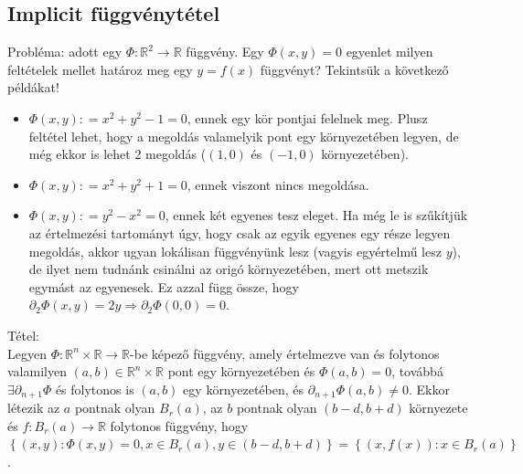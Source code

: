 \documentclass[12pt,a4paper]{scrartcl}
\providecommand{\tightlist}{%
  \setlength{\itemsep}{0pt}\setlength{\parskip}{0pt}}
\newenvironment{tetel}{}{}
\begin{document}
\hypertarget{implicit-fuggvenytetel}{%
\subsection{Implicit függvénytétel}\label{implicit-fuggvenytetel}}

Probléma: adott egy
\(\left. \Phi:{\mathbb{R}}^{2}\rightarrow{\mathbb{R}} \right.\)
függvény. Egy \(\Phi\left( {x,y} \right) = 0\) egyenlet milyen
feltételek mellet határoz meg egy \(y = f\left( x \right)\) függvényt?
Tekintsük a következő példákat!

\begin{itemize}
\tightlist
\item
  \(\Phi\left( {x,y} \right): = x^{2} + y^{2} - 1 = 0\), ennek egy kör
  pontjai felelnek meg. Plusz feltétel lehet, hogy a megoldás valamelyik
  pont egy környezetében legyen, de még ekkor is lehet 2 megoldás
  (\(\left( 1,0 \right)\) és \(\left( {- 1,0} \right)\) környezetében).
\item
  \(\Phi\left( {x,y} \right): = x^{2} + y^{2} + 1 = 0\), ennek viszont
  nincs megoldása.
\item
  \(\Phi\left( {x,y} \right): = y^{2} - x^{2} = 0\), ennek két egyenes
  tesz eleget. Ha még le is szűkítjük az értelmezési tartományt úgy,
  hogy csak az egyik egyenes egy része legyen megoldás, akkor ugyan
  lokálisan függvényünk lesz (vagyis egyértelmű lesz \(y\)), de ilyet
  nem tudnánk csinálni az origó környezetében, mert ott metszik egymást
  az egyenesek. Ez azzal függ össze, hogy
  \(\left. \partial_{2}\Phi\left( {x,y} \right) = 2y\Rightarrow\partial_{2}\Phi\left( 0,0 \right) = 0 \right.\).
\end{itemize}

\begin{tetel}

Tétel:\\
Legyen
\(\left. \Phi:{\mathbb{R}}^{n} \times {\mathbb{R}}\rightarrow{\mathbb{R}} \right.\)-be
képező függvény, amely értelmezve van és folytonos valamilyen
\(\left( {a,b} \right) \in {\mathbb{R}}^{n} \times {\mathbb{R}}\) pont
egy környezetében és \(\Phi\left( {a,b} \right) = 0\), továbbá
\(\exists\partial_{n + 1}\Phi\) és folytonos is \(\left( {a,b} \right)\)
egy környezetében, és
\(\partial_{n + 1}\Phi\left( {a,b} \right) \neq 0\). Ekkor létezik az
\(a\) pontnak olyan \(B_{r}\left( a \right)\), az \(b\) pontnak olyan
\(\left( {b - d,b + d} \right)\) környezete és
\(\left. f:B_{r}\left( a \right)\rightarrow{\mathbb{R}} \right.\)
folytonos függvény, hogy
\(\left\{ {\left( {x,y} \right):\Phi\left( {x,y} \right) = 0,x \in B_{r}\left( a \right),y \in \left( {b - d,b + d} \right)} \right\} = \left\{ {\left( {x,f\left( x \right)} \right):x \in B_{r}\left( a \right)} \right\}\).

\end{tetel}
\end{document}
